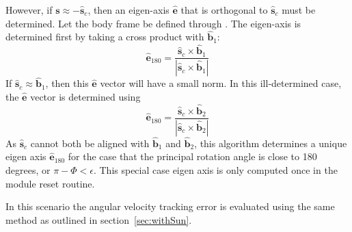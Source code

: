  
However, if $\bm s \approx -\hat{\bm s}_{c}$, then an eigen-axis $\hat{\bm e}$ that is orthogonal to $\hat{\bm s}_{c}$ must be determined.  Let the body frame be defined through .  The eigen-axis is determined first by taking a cross product with $\hat{\bm b}_{1}$:
 \begin{equation}
	\label{eq:ssp:7}
	\hat{\bm e}_{180} = \frac{ \hat{\bm s}_{c} \times \hat{\bm b}_{1}}{| \hat{\bm s}_{c} \times \hat{\bm b}_{1}|}
\end{equation}
If $\hat{\bm s}_{c} \approx \hat{\bm b}_{1}$, then this $\hat{\bm e}$ vector will have a small norm.  In this ill-determined case, the $\hat{\bm e}$ vector is determined using
 \begin{equation}
	\label{eq:ssp:8}
	\hat{\bm e}_{180} = \frac{ \hat{\bm s}_{c} \times \hat{\bm b}_{2}}{| \hat{\bm s}_{c} \times \hat{\bm b}_{2}|}
\end{equation}
As $ \hat{\bm s}_{c}$ cannot both be aligned with $\hat{\bm b}_{1}$ and $\hat{\bm b}_{2}$, this algorithm determines a unique eigen axis $\hat{\bm e}_{180}$ for the case that the principal rotation angle is close to 180 degrees, or $\pi - \Phi < \epsilon$.  This special case eigen axis is only computed once in the module reset routine.

In this scenario the angular velocity tracking error is evaluated using the same method as outlined in section~\ref{sec:withSun}.
 
 